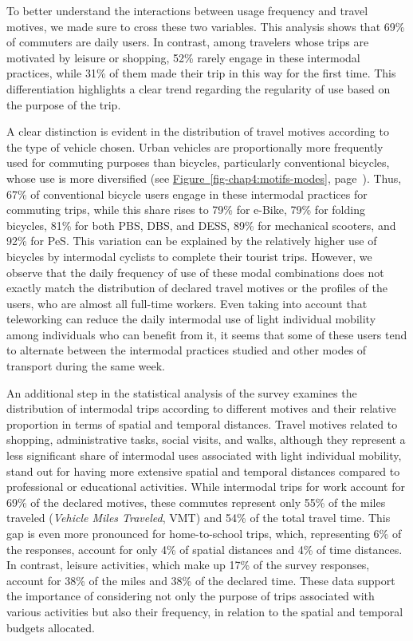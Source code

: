 \begin{refsegment}
To better understand the interactions between usage frequency and travel motives, we made sure to cross these two variables. This analysis shows that 69\% of commuters are daily users. In contrast, among travelers whose trips are motivated by leisure or shopping, 52\% rarely engage in these intermodal practices, while 31\% of them made their trip in this way for the first time. This differentiation highlights a clear trend regarding the regularity of use based on the purpose of the trip.%

A clear distinction is evident in the distribution of travel motives according to the type of vehicle chosen. Urban  vehicles are proportionally more frequently used for commuting purposes than bicycles, particularly conventional bicycles, whose use is more diversified (see \hyperref[fig-chap4:motifs-modes]{Figure~\ref{fig-chap4:motifs-modes}}, page~\pageref{fig-chap4:motifs-modes}). Thus, 67\% of conventional bicycle users engage in these intermodal practices for commuting trips, while this share rises to 79\% for \acrshort{e-Bike}, 79\% for folding bicycles, 81\% for both \acrshort{PBS}, \acrshort{DBS}, and \acrshort{DESS}, 89\% for mechanical scooters, and 92\% for \acrshort{PeS}. This variation can be explained by the relatively higher use of bicycles by intermodal cyclists to complete their tourist trips. However, we observe that the daily frequency of use of these modal combinations does not exactly match the distribution of declared travel motives or the profiles of the users, who are almost all full-time workers. Even taking into account that teleworking can reduce the daily intermodal use of light individual mobility among individuals who can benefit from it, it seems that some of these users tend to alternate between the intermodal practices studied and other modes of transport during the same week.%

An additional step in the statistical analysis of the survey examines the distribution of intermodal trips according to different motives and their relative proportion in terms of spatial and temporal distances. Travel motives related to shopping, administrative tasks, social visits, and walks, although they represent a less significant share of intermodal uses associated with light individual mobility, stand out for having more extensive spatial and temporal distances compared to professional or educational activities. While intermodal trips for work account for 69\% of the declared motives, these commutes represent only 55\% of the miles traveled (\textsl{Vehicle Miles Traveled}, VMT) and 54\% of the total travel time. This gap is even more pronounced for home-to-school trips, which, representing 6\% of the responses, account for only 4\% of spatial distances and 4\% of time distances. In contrast, leisure activities, which make up 17\% of the survey responses, account for 38\% of the miles and 38\% of the declared time. These data support the importance of considering not only the purpose of trips associated with various activities but also their frequency, in relation to the spatial and temporal budgets allocated.%


\end{refsegment}
